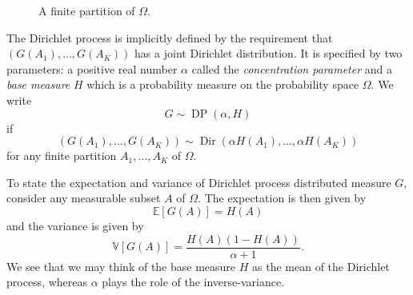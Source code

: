 \documentclass[final,3p,times,twocolumn]{elsarticle}
\DeclareMathOperator*{\Dir}{Dir}
\DeclareMathOperator*{\DP}{DP}
\begin{document}
\begin{figure}
\caption{A finite partition of $\Omega$.}
\label{fig:partition}
\end{figure}

The Dirichlet process is implicitly defined by the requirement that $\left(G(A_1), \dots, G(A_K)\right)$ has a joint Dirichlet distribution.
It is specified by two parameters: a positive real number $\alpha$ called the \emph{concentration parameter} and a \emph{base measure} $H$ which is a probability measure on the probability space $\Omega$.
We write 
\[G \sim \DP(\alpha,H)\]
if 
\begin{equation*}
\left(G(A_1),\dots,G(A_K)\right) \sim \Dir\left(\alpha H(A_1), \dots, \alpha H(A_K)\right)
\end{equation*}
for any finite partition $A_1,\dots,A_K$ of $\Omega$.

To state the expectation and variance of Dirichlet process distributed measure $G$, consider any measurable subset $A$ of $\Omega$. 
The expectation is then given by
\begin{equation*}
\mathbb{E}\left[G(A)\right] = H(A)
\end{equation*}
and the variance is given by
\begin{equation*}
\mathbb{V}\left[G(A)\right] = \frac{H(A)(1-H(A))}{\alpha + 1}.
\end{equation*}
We see that we may think of the base measure $H$ as the mean of the Dirichlet process, whereas $\alpha$ plays the role of the inverse-variance.
\end{document}
